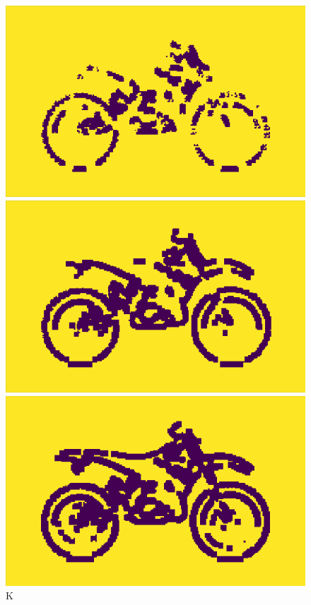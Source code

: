 \documentclass[11pt,a4paper]{scrartcl}
\begin{document}
\begin{figure}[h]
	\centering
	\begin{minipage}[b]{0.32\textwidth}
		\includegraphics[width=\textwidth]{images/K_1}
	\end{minipage}
	\hfill
	\begin{minipage}[b]{0.32\textwidth}
		\includegraphics[width=\textwidth]{images/K_2}
	\end{minipage}
	\hfill
	\begin{minipage}[b]{0.32\textwidth}
		\includegraphics[width=\textwidth]{images/K_3}
	\end{minipage}
	\caption{K}
	\label{fig:k}
\end{figure}
\end{document}
